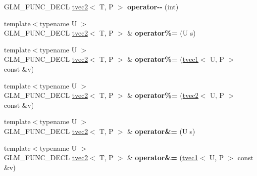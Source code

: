 \begin{DoxyCompactItemize}
\item 
\hypertarget{structglm_1_1tvec2_a9383c7de9b2c7001bd349d429985f96b}{G\-L\-M\-\_\-\-F\-U\-N\-C\-\_\-\-D\-E\-C\-L \hyperlink{structglm_1_1tvec2}{tvec2}$<$ T, P $>$ {\bfseries operator-\/-\/} (int)}\label{structglm_1_1tvec2_a9383c7de9b2c7001bd349d429985f96b}

\item 
\hypertarget{structglm_1_1tvec2_a29a67c2d6713e7ee90f30a8c1875fb96}{{\footnotesize template$<$typename U $>$ }\\G\-L\-M\-\_\-\-F\-U\-N\-C\-\_\-\-D\-E\-C\-L \hyperlink{structglm_1_1tvec2}{tvec2}$<$ T, P $>$ \& {\bfseries operator\%=} (U s)}\label{structglm_1_1tvec2_a29a67c2d6713e7ee90f30a8c1875fb96}

\item 
\hypertarget{structglm_1_1tvec2_a3750a63ccad2387d232a88a1abafa0aa}{{\footnotesize template$<$typename U $>$ }\\G\-L\-M\-\_\-\-F\-U\-N\-C\-\_\-\-D\-E\-C\-L \hyperlink{structglm_1_1tvec2}{tvec2}$<$ T, P $>$ \& {\bfseries operator\%=} (\hyperlink{structglm_1_1tvec1}{tvec1}$<$ U, P $>$ const \&v)}\label{structglm_1_1tvec2_a3750a63ccad2387d232a88a1abafa0aa}

\item 
\hypertarget{structglm_1_1tvec2_a3b939592b620fb6b0d7edd95c7863f0d}{{\footnotesize template$<$typename U $>$ }\\G\-L\-M\-\_\-\-F\-U\-N\-C\-\_\-\-D\-E\-C\-L \hyperlink{structglm_1_1tvec2}{tvec2}$<$ T, P $>$ \& {\bfseries operator\%=} (\hyperlink{structglm_1_1tvec2}{tvec2}$<$ U, P $>$ const \&v)}\label{structglm_1_1tvec2_a3b939592b620fb6b0d7edd95c7863f0d}

\item 
\hypertarget{structglm_1_1tvec2_a8e9a4b5df0216bd755757b0561dea553}{{\footnotesize template$<$typename U $>$ }\\G\-L\-M\-\_\-\-F\-U\-N\-C\-\_\-\-D\-E\-C\-L \hyperlink{structglm_1_1tvec2}{tvec2}$<$ T, P $>$ \& {\bfseries operator\&=} (U s)}\label{structglm_1_1tvec2_a8e9a4b5df0216bd755757b0561dea553}

\item 
\hypertarget{structglm_1_1tvec2_acd64e45f039ba3b658d5a46d99fff26a}{{\footnotesize template$<$typename U $>$ }\\G\-L\-M\-\_\-\-F\-U\-N\-C\-\_\-\-D\-E\-C\-L \hyperlink{structglm_1_1tvec2}{tvec2}$<$ T, P $>$ \& {\bfseries operator\&=} (\hyperlink{structglm_1_1tvec1}{tvec1}$<$ U, P $>$ const \&v)}\label{structglm_1_1tvec2_acd64e45f039ba3b658d5a46d99fff26a}


\end{DoxyCompactItemize}
